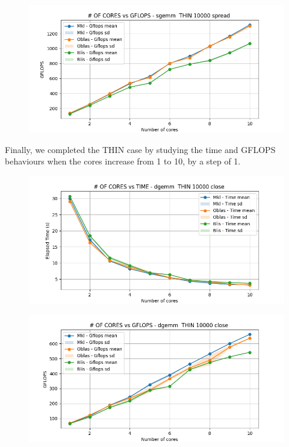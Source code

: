 \documentclass{article}
\begin{document}
\begin{figure}[H]
    \centering
    \includegraphics[width=\textwidth]{THIN scalability deep/sgemm__THIN_10000_spread_gflops.png}
\end{figure}

Finally, we completed the THIN case by studying the time and GFLOPS behaviours when the cores increase from 1 to 10, by a step of 1.
\begin{figure}[H]
    \centering
    \includegraphics[width=\textwidth]{THIN scalability deep/dgemm__THIN_10000_close_time.png}
\end{figure}

\begin{figure}[H]
    \centering
    \includegraphics[width=\textwidth]{THIN scalability deep/dgemm__THIN_10000_close_gflops.png}
\end{figure}
\end{document}
